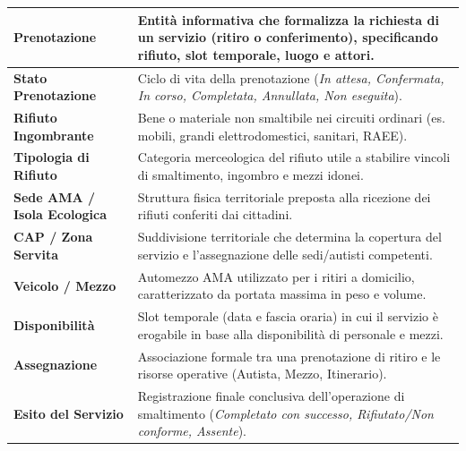 \begin{center}
\begin{longtable}{|p{4.2cm}|p{11.2cm}|}
\textbf{Prenotazione} & Entità informativa che formalizza la richiesta di un servizio (ritiro o conferimento), specificando rifiuto, slot temporale, luogo e attori. \\ \hline

\textbf{Stato Prenotazione} & Ciclo di vita della prenotazione (\textit{In attesa, Confermata, In corso, Completata, Annullata, Non eseguita}). \\ \hline

\textbf{Rifiuto Ingombrante} & Bene o materiale non smaltibile nei circuiti ordinari (es. mobili, grandi elettrodomestici, sanitari, RAEE). \\ \hline

\textbf{Tipologia di Rifiuto} & Categoria merceologica del rifiuto utile a stabilire vincoli di smaltimento, ingombro e mezzi idonei. \\ \hline

\textbf{Sede AMA / Isola Ecologica} & Struttura fisica territoriale preposta alla ricezione dei rifiuti conferiti dai cittadini. \\ \hline

\textbf{CAP / Zona Servita} & Suddivisione territoriale che determina la copertura del servizio e l'assegnazione delle sedi/autisti competenti. \\ \hline

\textbf{Veicolo / Mezzo} & Automezzo AMA utilizzato per i ritiri a domicilio, caratterizzato da portata massima in peso e volume. \\ \hline

\textbf{Disponibilità} & Slot temporale (data e fascia oraria) in cui il servizio è erogabile in base alla disponibilità di personale e mezzi. \\ \hline

\textbf{Assegnazione} & Associazione formale tra una prenotazione di ritiro e le risorse operative (Autista, Mezzo, Itinerario). \\ \hline

\textbf{Esito del Servizio} & Registrazione finale conclusiva dell'operazione di smaltimento (\textit{Completato con successo, Rifiutato/Non conforme, Assente}). \\ \hline
\end{longtable}
\end{center}
